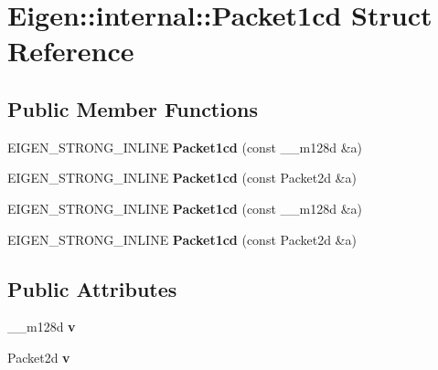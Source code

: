 \hypertarget{struct_eigen_1_1internal_1_1_packet1cd}{}\section{Eigen\+:\+:internal\+:\+:Packet1cd Struct Reference}
\label{struct_eigen_1_1internal_1_1_packet1cd}
\subsection*{Public Member Functions}
\begin{DoxyCompactItemize}
\item 
\mbox{\label{struct_eigen_1_1internal_1_1_packet1cd_aeb444472fc78b80b83f5258b00806fd2}} 
E\+I\+G\+E\+N\+\_\+\+S\+T\+R\+O\+N\+G\+\_\+\+I\+N\+L\+I\+NE {\bfseries Packet1cd} (const \+\_\+\+\_\+m128d \&a)
\item 
\mbox{\label{struct_eigen_1_1internal_1_1_packet1cd_a536e144bdddffb2fbb24024e7bd451b6}} 
E\+I\+G\+E\+N\+\_\+\+S\+T\+R\+O\+N\+G\+\_\+\+I\+N\+L\+I\+NE {\bfseries Packet1cd} (const Packet2d \&a)
\item 
\mbox{\label{struct_eigen_1_1internal_1_1_packet1cd_aeb444472fc78b80b83f5258b00806fd2}} 
E\+I\+G\+E\+N\+\_\+\+S\+T\+R\+O\+N\+G\+\_\+\+I\+N\+L\+I\+NE {\bfseries Packet1cd} (const \+\_\+\+\_\+m128d \&a)
\item 
\mbox{\label{struct_eigen_1_1internal_1_1_packet1cd_a536e144bdddffb2fbb24024e7bd451b6}} 
E\+I\+G\+E\+N\+\_\+\+S\+T\+R\+O\+N\+G\+\_\+\+I\+N\+L\+I\+NE {\bfseries Packet1cd} (const Packet2d \&a)
\end{DoxyCompactItemize}
\subsection*{Public Attributes}
\begin{DoxyCompactItemize}
\item 
\mbox{\label{struct_eigen_1_1internal_1_1_packet1cd_acefdb72009987d2a8757b65f1a4f1961}} 
\+\_\+\+\_\+m128d {\bfseries v}
\item 
\mbox{\label{struct_eigen_1_1internal_1_1_packet1cd_acefdb72009987d2a8757b65f1a4f1961}} 
Packet2d {\bfseries v}
\end{DoxyCompactItemize}


